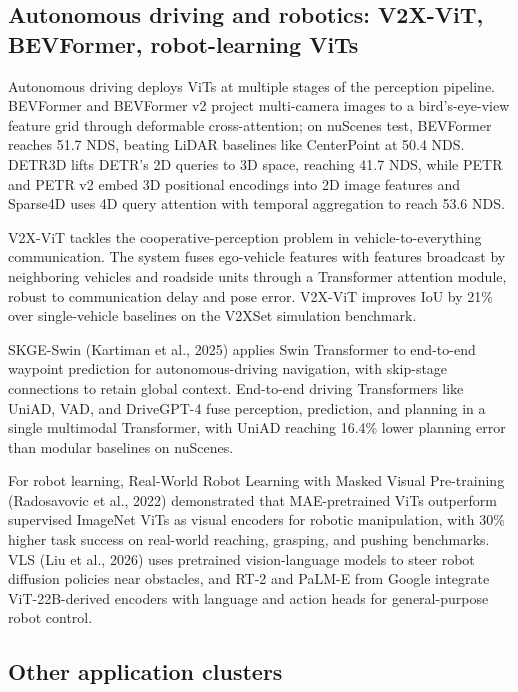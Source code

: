 \documentclass{article}
\begin{document}
\subsection{Autonomous driving and robotics: V2X-ViT, BEVFormer, robot-learning ViTs}\label{autonomous-driving-and-robotics-v2x-vit-bevformer-robot-learning-vits}

Autonomous driving deploys ViTs at multiple stages of the perception pipeline. BEVFormer \citep{li2023transformerbasedvi} and BEVFormer v2 project multi-camera images to a bird's-eye-view feature grid through deformable cross-attention; on nuScenes test, BEVFormer reaches 51.7 NDS, beating LiDAR baselines like CenterPoint at 50.4 NDS. DETR3D lifts DETR's 2D queries to 3D space, reaching 41.7 NDS, while PETR and PETR v2 embed 3D positional encodings into 2D image features and Sparse4D uses 4D query attention with temporal aggregation to reach 53.6 NDS.

V2X-ViT \citep{xu2022multiclasstokentra} tackles the cooperative-perception problem in vehicle-to-everything communication. The system fuses ego-vehicle features with features broadcast by neighboring vehicles and roadside units through a Transformer attention module, robust to communication delay and pose error. V2X-ViT improves IoU by 21\% over single-vehicle baselines on the V2XSet simulation benchmark.

SKGE-Swin (Kartiman et al., 2025) applies Swin Transformer to end-to-end waypoint prediction for autonomous-driving navigation, with skip-stage connections to retain global context. End-to-end driving Transformers like UniAD, VAD, and DriveGPT-4 fuse perception, prediction, and planning in a single multimodal Transformer, with UniAD reaching 16.4\% lower planning error than modular baselines on nuScenes.

For robot learning, Real-World Robot Learning with Masked Visual Pre-training (Radosavovic et al., 2022) demonstrated that MAE-pretrained ViTs outperform supervised ImageNet ViTs as visual encoders for robotic manipulation, with 30\% higher task success on real-world reaching, grasping, and pushing benchmarks. VLS (Liu et al., 2026) uses pretrained vision-language models to steer robot diffusion policies near obstacles, and RT-2 and PaLM-E from Google integrate ViT-22B-derived encoders with language and action heads for general-purpose robot control.

\subsection{Other application clusters}\label{other-application-clusters}
\end{document}
